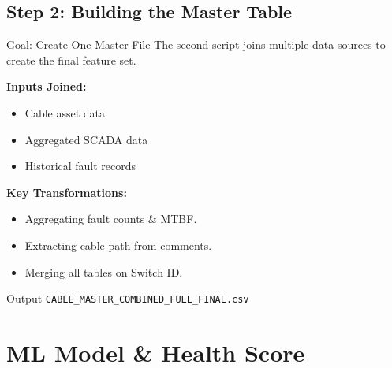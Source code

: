 \documentclass[a4paper,11pt]{article}
\begin{document}
\subsection{Step 2: Building the Master Table}
\begin{alertblock}{Goal: Create One Master File}
    The second script joins multiple data sources to create the final feature set.
\end{alertblock}
\vspace{1em}
\textbf{Inputs Joined:}
\begin{itemize}
    \item Cable asset data
    \item Aggregated SCADA data
    \item Historical fault records
\end{itemize}
\vspace{1em}
\textbf{Key Transformations:}
\begin{itemize}
    \item Aggregating fault counts \& MTBF.
    \item Extracting cable path from comments.
    \item Merging all tables on Switch ID.
\end{itemize}

\begin{block}{Output}
    \texttt{CABLE\_MASTER\_COMBINED\_FULL\_FINAL.csv}
\end{block}
\newpage

\section{ML Model \& Health Score}
\end{document}

